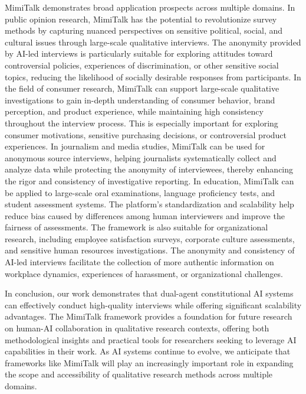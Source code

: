 \documentclass[sigchi,nonacm,manuscript]{acmart}
\begin{document}
MimiTalk demonstrates broad application prospects across multiple domains. In public opinion research, MimiTalk has the potential to revolutionize survey methods by capturing nuanced perspectives on sensitive political, social, and cultural issues through large-scale qualitative interviews. The anonymity provided by AI-led interviews is particularly suitable for exploring attitudes toward controversial policies, experiences of discrimination, or other sensitive social topics, reducing the likelihood of socially desirable responses from participants. In the field of consumer research, MimiTalk can support large-scale qualitative investigations to gain in-depth understanding of consumer behavior, brand perception, and product experience, while maintaining high consistency throughout the interview process. This is especially important for exploring consumer motivations, sensitive purchasing decisions, or controversial product experiences. In journalism and media studies, MimiTalk can be used for anonymous source interviews, helping journalists systematically collect and analyze data while protecting the anonymity of interviewees, thereby enhancing the rigor and consistency of investigative reporting. In education, MimiTalk can be applied to large-scale oral examinations, language proficiency tests, and student assessment systems. The platform’s standardization and scalability help reduce bias caused by differences among human interviewers and improve the fairness of assessments. The framework is also suitable for organizational research, including employee satisfaction surveys, corporate culture assessments, and sensitive human resources investigations. The anonymity and consistency of AI-led interviews facilitate the collection of more authentic information on workplace dynamics, experiences of harassment, or organizational challenges.

In conclusion, our work demonstrates that dual-agent constitutional AI systems can effectively conduct high-quality interviews while offering significant scalability advantages. The MimiTalk framework provides a foundation for future research on human-AI collaboration in qualitative research contexts, offering both methodological insights and practical tools for researchers seeking to leverage AI capabilities in their work. As AI systems continue to evolve, we anticipate that frameworks like MimiTalk will play an increasingly important role in expanding the scope and accessibility of qualitative research methods across multiple domains.
\end{document}
